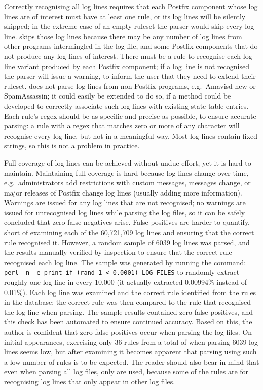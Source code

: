 Correctly recognising all log lines requires that each Postfix component
whose log lines are of interest must have at least one rule, or its log
lines will be silently skipped; in the extreme case of an empty ruleset the
parser would skip every log line.  \parsername{} skips those log lines
because there may be any number of log lines from other programs
intermingled in the log file, and some Postfix components that do not
produce any log lines of interest.  There must be a rule to recognise each
log line variant produced by each Postfix component; if a log line is not
recognised the parser will issue a warning, to inform the user that they
need to extend their ruleset.  \parsername{} does not parse log lines from
non-Postfix programs, e.g.\ Amavisd-new or SpamAssassin; it could easily be
extended to do so, if a method could be developed to correctly associate
such log lines with existing state table entries.  Each rule's regex should
be as specific and precise as possible, to ensure accurate parsing: a rule
with a regex that matches zero or more of any character will recognise
every log line, but not in a meaningful way.  Most log lines contain fixed
strings, so this is not a problem in practice.

Full coverage of log lines can be achieved without undue effort, yet it is
hard to maintain.  Maintaining full coverage is hard because log lines
change over time, e.g.\ administrators add restrictions with custom
messages,  messages change, or major releases of Postfix
change log lines (usually adding more information).  Warnings are issued
for any log lines that are not recognised; no warnings are issued for
unrecognised log lines while parsing the \numberOFlogFILES{} log files, so
it can be safely concluded that zero false negatives arise.  False
positives are harder to quantify, short of examining each of the 60,721,709
log lines and ensuring that the correct rule recognised it.  However, a
random sample of 6039 log lines was parsed, and the results manually
verified by inspection to ensure that the correct rule recognised each log
line.  The sample was generated by running the command: \texttt{perl -n -e
\singlequote{}print if (rand 1 < 0.0001)\singlequote{} LOG\_FILES} to
randomly extract roughly one log line in every 10,000 (it actually
extracted 0.00994\% instead of 0.01\%).  Each log line was examined and the
correct rule identified from the \numberOFrules{} rules in the database;
the correct rule was then compared to the rule that recognised the log line
when parsing.  The sample results contained zero false positives, and this
check has been automated to ensure continued accuracy.  Based on this, the
author is confident that zero false positives occur when parsing the
\numberOFlogFILES{} log files.  On initial appearances, exercising only 36
rules from a total of \numberOFrules{} when parsing 6039 log lines seems
low, but after examining  it becomes apparent
that parsing using such a low number of rules is to be expected.  The
reader should also bear in mind that even when parsing all
\numberOFlogFILES{} log files, only \numberOFrulesMINIMUM{} are used,
because some of the rules are for recognising log lines that only appear in
other log files.

